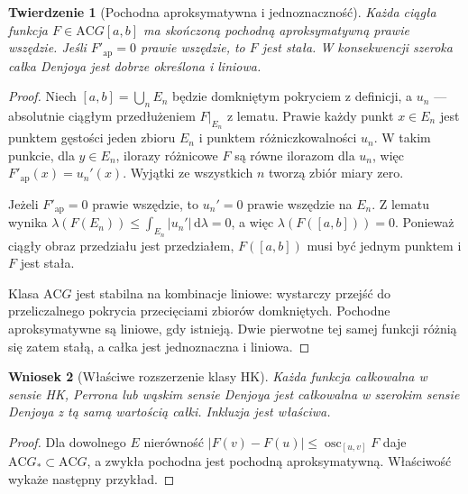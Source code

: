\documentclass[11pt,a4paper]{article}
\numberwithin{equation}{section}
\theoremstyle{plain}
\newtheorem{twierdzenie}{Twierdzenie}[section]
\newtheorem{wniosek}[twierdzenie]{Wniosek}
\theoremstyle{definition}
\theoremstyle{remark}
\newcommand{\osc}{\operatorname{osc}}
\newcommand{\AC}{\mathrm{AC}}
\begin{document}
\begin{twierdzenie}[Pochodna aproksymatywna i jednoznaczność]
Każda ciągła funkcja $F\in\AC G[a,b]$ ma skończoną pochodną aproksymatywną prawie wszędzie. Jeśli $F'_{\mathrm{ap}}=0$ prawie wszędzie, to $F$ jest stała. W konsekwencji szeroka całka Denjoya jest dobrze określona i liniowa.
\end{twierdzenie}
\begin{proof}
Niech $[a,b]=\bigcup_n E_n$ będzie domkniętym pokryciem z definicji, a $u_n$ --- absolutnie ciągłym przedłużeniem $F|_{E_n}$ z lematu. Prawie każdy punkt $x\in E_n$ jest punktem gęstości jeden zbioru $E_n$ i punktem różniczkowalności $u_n$. W takim punkcie, dla $y\in E_n$, ilorazy różnicowe $F$ są równe ilorazom dla $u_n$, więc $F'_{\mathrm{ap}}(x)=u_n'(x)$. Wyjątki ze wszystkich $n$ tworzą zbiór miary zero.

Jeżeli $F'_{\mathrm{ap}}=0$ prawie wszędzie, to $u_n'=0$ prawie wszędzie na $E_n$. Z lematu wynika $\lambda(F(E_n))\le\int_{E_n}|u_n'|\,\mathrm d\lambda=0$, a więc $\lambda(F([a,b]))=0$. Ponieważ ciągły obraz przedziału jest przedziałem, $F([a,b])$ musi być jednym punktem i $F$ jest stała.

Klasa $\AC G$ jest stabilna na kombinacje liniowe: wystarczy przejść do przeliczalnego pokrycia przecięciami zbiorów domkniętych. Pochodne aproksymatywne są liniowe, gdy istnieją. Dwie pierwotne tej samej funkcji różnią się zatem stałą, a całka jest jednoznaczna i liniowa.
\end{proof}
\begin{wniosek}[Właściwe rozszerzenie klasy HK]
Każda funkcja całkowalna w sensie HK, Perrona lub wąskim sensie Denjoya jest całkowalna w szerokim sensie Denjoya z tą samą wartością całki. Inkluzja jest właściwa.
\end{wniosek}
\begin{proof}
Dla dowolnego $E$ nierówność $|F(v)-F(u)|\le\osc_{[u,v]}F$ daje $\AC G_*\subset\AC G$, a zwykła pochodna jest pochodną aproksymatywną. Właściwość wykaże następny przykład.
\end{proof}
\end{document}
